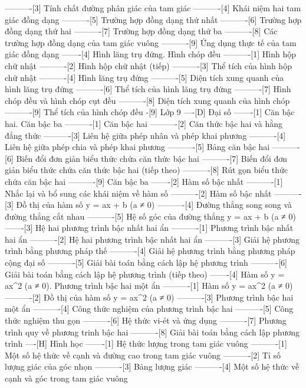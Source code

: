 ----------[3] Tính chất đường phân giác của tam giác
----------[4] Khái niệm hai tam giác đồng dạng
----------[5] Trường hợp đồng dạng thứ nhất
----------[6] Trường hợp đồng dạng thứ hai
----------[7] Trường hợp đồng dạng thứ ba
----------[8] Các trường hợp đồng dạng của tam giác vuông
----------[9] Ứng dụng thực tế của tam giác đồng dạng
-------[4] Hình lăng trụ đứng. Hình chóp đều
----------[1] Hình hộp chữ nhật
----------[2] Hình hộp chữ nhật (tiếp)
----------[3] Thể tích của hình hộp chữ nhật
----------[4] Hình lăng trụ đứng
----------[5] Diện tích xung quanh của hình lăng trụ đứng
----------[6] Thể tích của hình lăng trụ đứng
----------[7] Hình chóp đều và hình chóp cụt đều
----------[8] Diện tích xung quanh của hình chóp
----------[9] Thể tích của hình chóp đều
-[9] Lớp 9
----[D] Đại số
-------[1] Căn bậc hai. Căn bậc ba
----------[1] Căn bậc hai
----------[2] Căn thức bậc hai và hằng đẳng thức
----------[3] Liên hệ giữa phép nhân và phép khai phương
----------[4] Liên hệ giữa phép chia và phép khai phương
----------[5] Bảng căn bậc hai
----------[6] Biến đổi đơn giản biểu thức chứa căn thức bậc hai
----------[7] Biến đổi đơn giản biểu thức chứa căn thức bậc hai (tiếp theo)
----------[8] Rút gọn biểu thức chứa căn bậc hai
----------[9] Căn bậc ba
-------[2] Hàm số bậc nhất
----------[1] Nhắc lại và bổ sung các khái niệm về hàm số
----------[2] Hàm số bậc nhất
----------[3] Đồ thị của hàm số y = ax + b (a ≠ 0)
----------[4] Đường thẳng song song và đường thẳng cắt nhau
----------[5] Hệ số góc của đường thẳng y = ax + b (a ≠ 0)
-------[3] Hệ hai phương trình bậc nhất hai ẩn
----------[1] Phương trình bậc nhất hai ẩn
----------[2] Hệ hai phương trình bậc nhất hai ẩn
----------[3] Giải hệ phương trình bằng phương pháp thế
----------[4] Giải hệ phương trình bằng phương pháp cộng đại số
----------[5] Giải bài toán bằng cách lập hệ phương trình
----------[6] Giải bài toán bằng cách lập hệ phương trình (tiếp theo)
-------[4] Hàm số y = ax^2 (a ≠ 0). Phương trình bậc hai một ẩn
----------[1] Hàm số y = ax^2 (a ≠ 0)
----------[2] Đồ thị của hàm số y = ax^2 (a ≠ 0)
----------[3] Phương trình bậc hai một ẩn
----------[4] Công thức nghiệm của phương trình bậc hai
----------[5] Công thức nghiệm thu gọn
----------[6] Hệ thức vi-ét và ứng dụng
----------[7] Phương trình quy về phương trinh bậc hai
----------[8] Giải bài toán bằng cách lập phương trình
----[H] Hình học
-------[1] Hệ thức lượng trong tam giác vuông
----------[1] Một số hệ thức về cạnh và đường cao trong tam giác vuông
----------[2] Tỉ số lượng giác của góc nhọn
----------[3] Bảng lượng giác
----------[4] Một số hệ thức về cạnh và góc trong tam giác vuông
